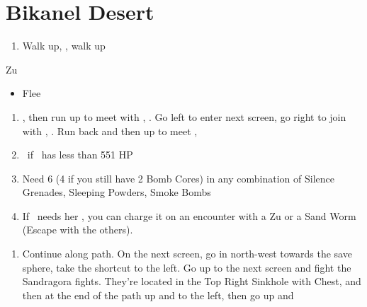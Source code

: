 \chapter{Bikanel Desert}

\begin{enumerate}
	\item Walk up, \sd, walk up
\end{enumerate}
\begin{battle}{Zu}
	\begin{itemize}
		\tidusf Attack
		\enemyf Attack
		\tidusf Equip Sonic Steal
		\tidusf Defend until \lulu\ shows up
		\auronf Defend until \lulu\ shows up
		\item Flee
	\end{itemize}
\end{battle}
\begin{enumerate}[resume]
	\item \sd, then run up to meet with \wakka, \sd. Go left to enter next screen, go right to join with \kimahri, \sd. Run back and then up to meet \rikku, \sd
	\item \save\ if \tidus\ has less than 551 HP
	\item Need 6 (4 if you still have 2 Bomb Cores) in any combination of Silence Grenades, Sleeping Powders, Smoke Bombs
	\item If \rikku\ needs her \od, you can charge it on an encounter with a Zu or a Sand Worm (Escape with the others).
\end{enumerate}
\begin{enumerate}[resume]
	\item Continue along path. On the next screen, go in north-west towards the save sphere, take the shortcut to the left. Go up to the next screen and fight the Sandragora fights. They're located in the Top Right Sinkhole with Chest, and then at the end of the path up and to the left, then go up and \sd
\end{enumerate}
\winvfill
